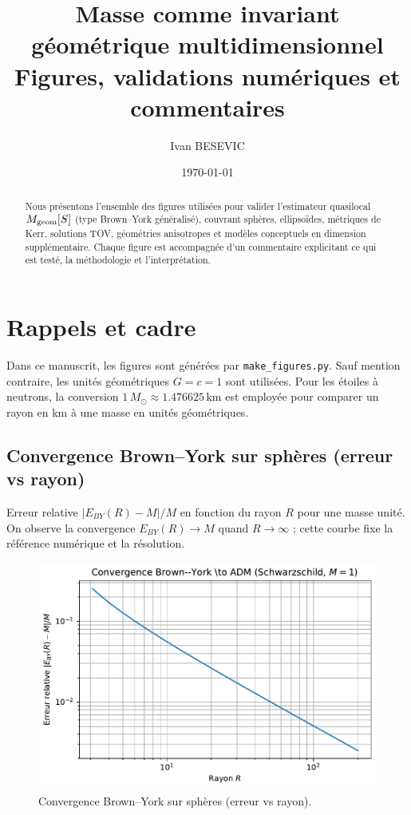 \documentclass[11pt,a4paper]{article}
\title{Masse comme invariant géométrique multidimensionnel\\
\large Figures, validations numériques et commentaires}
\author{Ivan BESEVIC}
\date{\today}
\begin{document}
\maketitle
\tableofcontents
\bigskip

\begin{abstract}
Nous présentons l'ensemble des figures utilisées pour valider l'estimateur quasilocal
$M_{\rm geom}[S]$ (type Brown--York généralisé), couvrant sphères, ellipsoïdes,
métriques de Kerr, solutions TOV, géométries anisotropes et modèles conceptuels en dimension
supplémentaire. Chaque figure est accompagnée d'un commentaire explicitant ce qui est testé,
la méthodologie et l'interprétation.
\end{abstract}

\section{Rappels et cadre}
Dans ce manuscrit, les figures sont générées par \texttt{make\_figures.py}. Sauf mention contraire,
les unités géométriques $G=c=1$ sont utilisées. Pour les étoiles à neutrons, la conversion
$1\,M_\odot \approx 1.476625\,\mathrm{km}$ est employée pour comparer un rayon en km à une masse en unités géométriques.
\subsection*{Convergence Brown–York sur sphères (erreur vs rayon)}
Erreur relative $\lvert E_{BY}(R)-M\rvert/M$ en fonction du rayon $R$ pour une masse unité. On observe la convergence $E_{BY}(R)\to M$ quand $R\to\infty$ ; cette courbe fixe la référence numérique et la résolution.

\begin{figure}[htbp]
  \centering
  \includegraphics[width=\linewidth]{fig_error_vs_radius_improved.pdf}
  \caption{Convergence Brown–York sur sphères (erreur vs rayon).}
  \label{fig:fig_error_vs_radius_improved}
\end{figure}
\end{document}
